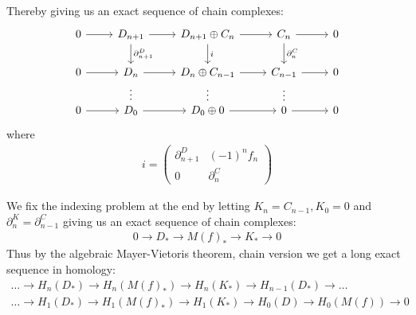 \documentclass[12pt]{book}
\theoremstyle{definition}
\begin{document}
Thereby giving us an exact sequence of chain complexes: 
\[
\begin{tikzcd}
    0  \arrow[r] & D_{n+1} \arrow[r] \arrow[d, "\partial^D_{n+1}"] 
    & D_{n+1} \oplus C_n \arrow[r] \arrow[d, "i"]
    & C_n \arrow[r] \arrow[d, "\partial^C_n"]
    & 0\\
    0  \arrow[r] & D_{n} \arrow[r] \arrow[d, phantom, "\vdots"]
    & D_{n} \oplus C_{n-1} \arrow[r] \arrow[d, phantom, "\vdots"]
    & C_{n-1} \arrow[r] \arrow[d, phantom, "\vdots"]
    & 0\\
    0  \arrow[r] & D_0 \arrow[r]
    & D_0 \oplus 0 \arrow[r] 
    & 0 \arrow[r] 
    & 0
\end{tikzcd}
\]
where 
\begin{align*}
    i = 
        \begin{pmatrix}
            \partial^D_{n+1} & (-1)^{n}f_{n} \\
            0                & \partial^C_{n}
        \end{pmatrix}
\end{align*}

We fix the indexing problem at the end by letting $K_n = C_{n-1}, K_0 = 0$ and $\partial^K_n = \partial^C_{n-1}$ giving us an exact sequence of chain complexes: 
\begin{align*}
    0 \rightarrow D_* \rightarrow M(f)_* \rightarrow K_* \rightarrow 0
\end{align*}
Thus by the algebraic Mayer-Vietoris theorem, chain version we get a long exact sequence in homology: 
\begin{align*}
    \dots \rightarrow H_n(D_*) \rightarrow H_n(M(f)_*) \rightarrow H_n(K_*) \rightarrow H_{n-1}(D_*) \rightarrow \dots \\
    \dots \rightarrow H_1(D_*) \rightarrow H_1(M(f)_*) \rightarrow H_1(K_*) \rightarrow H_0(D) \rightarrow H_0(M(f)) \rightarrow 0
\end{align*}
\end{document}
